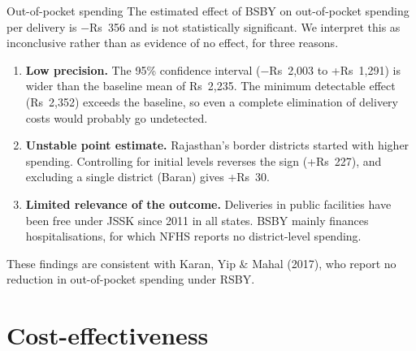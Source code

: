 \documentclass[compress]{beamer}
\newcommand{\Rs}{Rs~}
\begin{document}
\begin{frame}[t]{Out-of-pocket spending}
\small
The estimated effect of BSBY on out-of-pocket spending per delivery is $-$\Rs 356 and is not statistically significant. We interpret this as inconclusive rather than as evidence of no effect, for three reasons.

\vspace{6pt}
\begin{enumerate}
\item \textbf{Low precision.} The 95\% confidence interval ($-$\Rs 2,003 to +\Rs 1,291) is wider than the baseline mean of \Rs 2,235. The minimum detectable effect (\Rs 2,352) exceeds the baseline, so even a complete elimination of delivery costs would probably go undetected.

\item \textbf{Unstable point estimate.} Rajasthan's border districts started with higher spending. Controlling for initial levels reverses the sign (+\Rs 227), and excluding a single district (Baran) gives +\Rs 30.

\item \textbf{Limited relevance of the outcome.} Deliveries in public facilities have been free under JSSK since 2011 in all states. BSBY mainly finances hospitalisations, for which NFHS reports no district-level spending.
\end{enumerate}

\vspace{3pt}
These findings are consistent with Karan, Yip \& Mahal (2017), who report no reduction in out-of-pocket spending under RSBY.
\end{frame}

\section{Cost-effectiveness}
\end{document}
